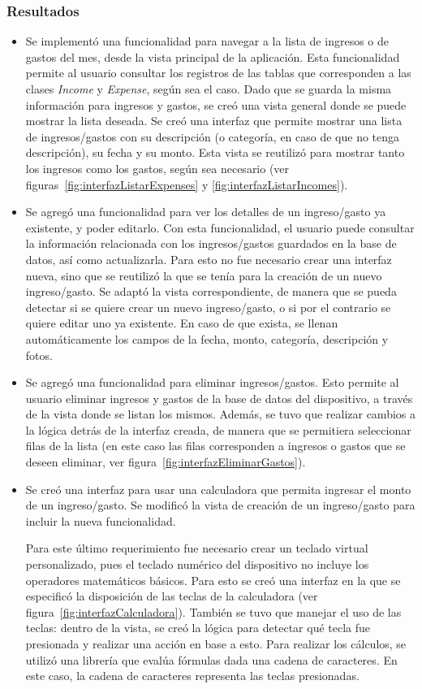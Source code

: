 \subsubsection{Resultados}
\begin{itemize}
\item Se implementó una funcionalidad para navegar a la lista de ingresos o de gastos del mes, desde la vista principal de la aplicación. Esta funcionalidad permite al usuario consultar los registros de las tablas que corresponden a las clases \textit{Income} y \textit{Expense}, según sea el caso. Dado que se guarda la misma información para ingresos y gastos, se creó una vista general donde se puede mostrar la lista deseada. Se creó una interfaz que permite mostrar una lista de ingresos/gastos con su descripción (o categoría, en caso de que no tenga descripción), su fecha y su monto. Esta vista se reutilizó para mostrar tanto los ingresos como los gastos, según sea necesario (ver figuras~\ref{fig:interfazListarExpenses} y \ref{fig:interfazListarIncomes}).
\item Se agregó una funcionalidad para ver los detalles de un ingreso/gasto ya existente, y poder editarlo. Con esta funcionalidad, el usuario puede consultar la información relacionada con los ingresos/gastos guardados en la base de datos, así como actualizarla. Para esto no fue necesario crear una interfaz nueva, sino que se reutilizó la que se tenía para la creación de un nuevo ingreso/gasto. Se adaptó la vista correspondiente, de manera que se pueda detectar si se quiere crear un nuevo ingreso/gasto, o si por el contrario se quiere editar uno ya existente. En caso de que exista, se llenan automáticamente los campos de la fecha, monto, categoría, descripción y fotos.
\item Se agregó una funcionalidad para eliminar ingresos/gastos. Esto permite al usuario eliminar ingresos y gastos de la base de datos del dispositivo, a través de la vista donde se listan los mismos. Además, se tuvo que realizar cambios a la lógica detrás de la interfaz creada, de manera que se permitiera seleccionar filas de la lista (en este caso las filas corresponden a ingresos o gastos que se deseen eliminar, ver figura~\ref{fig:interfazEliminarGastos}). 
\item Se creó una interfaz para usar una calculadora que permita ingresar el monto de un ingreso/gasto. Se modificó la vista de creación de un ingreso/gasto para incluir la nueva funcionalidad. 

Para este último requerimiento fue necesario crear un teclado virtual personalizado, pues el teclado numérico del dispositivo no incluye los operadores matemáticos básicos. Para esto se creó una interfaz en la que se especificó la disposición de las teclas de la calculadora (ver figura~\ref{fig:interfazCalculadora}). También se tuvo que manejar el uso de las teclas: dentro de la vista, se creó la lógica para detectar qué tecla fue presionada y realizar una acción en base a esto. Para realizar los cálculos, se utilizó una librería que evalúa fórmulas dada una cadena de caracteres. En este caso, la cadena de caracteres representa las teclas presionadas.


\end{itemize}
